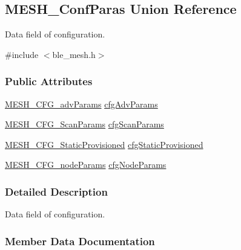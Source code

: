 \hypertarget{union_m_e_s_h___conf_paras}{}\subsection{M\+E\+S\+H\+\_\+\+Conf\+Paras Union Reference}
\label{union_m_e_s_h___conf_paras}


Data field of configuration.  




{\ttfamily \#include $<$ble\+\_\+mesh.\+h$>$}

\subsubsection*{Public Attributes}
\begin{DoxyCompactItemize}
\item 
\hyperlink{struct_m_e_s_h___c_f_g__adv_params}{M\+E\+S\+H\+\_\+\+C\+F\+G\+\_\+adv\+Params} \hyperlink{union_m_e_s_h___conf_paras_a3d3d55eb231ca0036bb3aa53801bc001}{cfg\+Adv\+Params}
\item 
\hyperlink{group___m_e_s_h_gad3b42c59d6315c75d9435d55fcbe3ac1}{M\+E\+S\+H\+\_\+\+C\+F\+G\+\_\+\+Scan\+Params} \hyperlink{union_m_e_s_h___conf_paras_aeb8868051d71109967492ec34057f804}{cfg\+Scan\+Params}
\item 
\hyperlink{struct_m_e_s_h___c_f_g___static_provisioned}{M\+E\+S\+H\+\_\+\+C\+F\+G\+\_\+\+Static\+Provisioned} \hyperlink{union_m_e_s_h___conf_paras_a910afc4956d3b2e20e6f004627e4349f}{cfg\+Static\+Provisioned}
\item 
\hyperlink{struct_m_e_s_h___c_f_g__node_params}{M\+E\+S\+H\+\_\+\+C\+F\+G\+\_\+node\+Params} \hyperlink{union_m_e_s_h___conf_paras_adb1eed0912b6181a43c70ffc4d8c3427}{cfg\+Node\+Params}
\end{DoxyCompactItemize}


\subsubsection{Detailed Description}
Data field of configuration. 

\subsubsection{Member Data Documentation}
